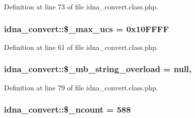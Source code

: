 Definition at line 73 of file idna\+\_\+convert.\+class.\+php.

\subsubsection[{\texorpdfstring{\$\+\_\+max\+\_\+ucs}{$_max_ucs}}]{\setlength{\rightskip}{0pt plus 5cm}idna\+\_\+convert\+::\$\+\_\+max\+\_\+ucs = 0x10\+F\+F\+FF\hspace{0.3cm}{\ttfamily [protected]}}\hypertarget{classidna__convert_aea20377d4d2659186a1901d6a66f5d58}{}\label{classidna__convert_aea20377d4d2659186a1901d6a66f5d58}


Definition at line 61 of file idna\+\_\+convert.\+class.\+php.

\subsubsection[{\texorpdfstring{\$\+\_\+mb\+\_\+string\+\_\+overload}{$_mb_string_overload}}]{\setlength{\rightskip}{0pt plus 5cm}idna\+\_\+convert\+::\$\+\_\+mb\+\_\+string\+\_\+overload = {\bf null}\hspace{0.3cm}{\ttfamily [static]}, {\ttfamily [protected]}}\hypertarget{classidna__convert_a36aba0d7717782343396a25026107dc7}{}\label{classidna__convert_a36aba0d7717782343396a25026107dc7}


Definition at line 79 of file idna\+\_\+convert.\+class.\+php.

\subsubsection[{\texorpdfstring{\$\+\_\+ncount}{$_ncount}}]{\setlength{\rightskip}{0pt plus 5cm}idna\+\_\+convert\+::\$\+\_\+ncount = 588\hspace{0.3cm}{\ttfamily [protected]}}\hypertarget{classidna__convert_a0e6408f36ff8f150adb9d1a67c7fe3e2}{}\label{classidna__convert_a0e6408f36ff8f150adb9d1a67c7fe3e2}


